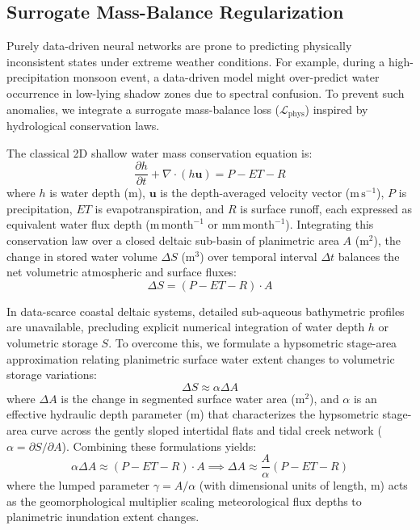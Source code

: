 \documentclass[preprint,12pt]{elsarticle}
\begin{document}
\subsection{Surrogate Mass-Balance Regularization}
Purely data-driven neural networks are prone to predicting physically inconsistent states under extreme weather conditions. For example, during a high-precipitation monsoon event, a data-driven model might over-predict water occurrence in low-lying shadow zones due to spectral confusion. To prevent such anomalies, we integrate a surrogate mass-balance loss ($\mathcal{L}_{\text{phys}}$) inspired by hydrological conservation laws.

The classical 2D shallow water mass conservation equation is:
\begin{equation}
\frac{\partial h}{\partial t} + \nabla \cdot (h \mathbf{u}) = P - ET - R
\end{equation}
where $h$ is water depth ($\mathrm{m}$), $\mathbf{u}$ is the depth-averaged velocity vector ($\mathrm{m\,s^{-1}}$), $P$ is precipitation, $ET$ is evapotranspiration, and $R$ is surface runoff, each expressed as equivalent water flux depth ($\mathrm{m\,month^{-1}}$ or $\mathrm{mm\,month^{-1}}$). Integrating this conservation law over a closed deltaic sub-basin of planimetric area $A$ ($\mathrm{m}^2$), the change in stored water volume $\Delta S$ ($\mathrm{m}^3$) over temporal interval $\Delta t$ balances the net volumetric atmospheric and surface fluxes:
\begin{equation}
\Delta S = (P - ET - R) \cdot A
\end{equation}

In data-scarce coastal deltaic systems, detailed sub-aqueous bathymetric profiles are unavailable, precluding explicit numerical integration of water depth $h$ or volumetric storage $S$. To overcome this, we formulate a hypsometric stage-area approximation relating planimetric surface water extent changes to volumetric storage variations:
\begin{equation}
\Delta S \approx \alpha \Delta A
\end{equation}
where $\Delta A$ is the change in segmented surface water area ($\mathrm{m}^2$), and $\alpha$ is an effective hydraulic depth parameter ($\mathrm{m}$) that characterizes the hypsometric stage-area curve across the gently sloped intertidal flats and tidal creek network ($\alpha = \partial S / \partial A$). Combining these formulations yields:
\begin{equation}
\alpha \Delta A \approx (P - ET - R) \cdot A \implies \Delta A \approx \frac{A}{\alpha} (P - ET - R)
\end{equation}
where the lumped parameter $\gamma = A / \alpha$ (with dimensional units of length, $\mathrm{m}$) acts as the geomorphological multiplier scaling meteorological flux depths to planimetric inundation extent changes.
\end{document}
